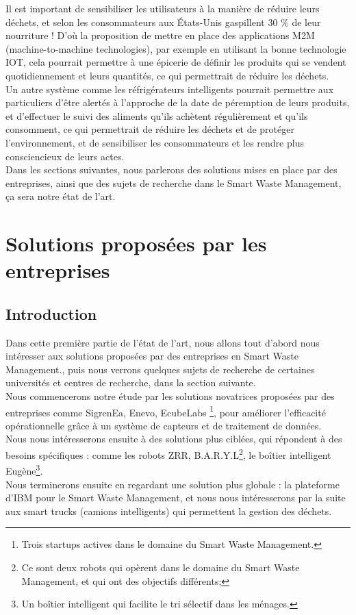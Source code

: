 \documentclass[a4paper,12pt]{report}
\begin{document}
Il est important de sensibiliser les utilisateurs à la manière de réduire leurs déchets, et selon \cite{ref2} les consommateurs aux États-Unis gaspillent 30 \% de leur nourriture ! D’où la proposition de mettre en place des applications M2M (machine-to-machine technologies), par exemple en utilisant la bonne technologie IOT, cela pourrait permettre à une épicerie de définir les produits qui se vendent quotidiennement et leurs quantités, ce qui permettrait de réduire les déchets.\\ Un autre système comme les réfrigérateurs intelligents pourrait permettre aux particuliers d’être alertés à l’approche de la date de péremption de leurs produits, et d’effectuer le suivi des aliments qu’ils achètent régulièrement et qu’ils consomment, ce qui permettrait de réduire les déchets et de protéger l’environnement, et de sensibiliser les consommateurs et les rendre plus consciencieux de leurs actes.\\
Dans les sections suivantes, nous parlerons des solutions mises en place par des entreprises, ainsi que des sujets de recherche dans le Smart Waste Management, ça sera notre état de l'art.
 
\section{Solutions proposées par les entreprises}
\subsection{Introduction}
Dans cette première partie de l'état de l'art, nous allons tout d'abord nous intéresser aux solutions proposées par des entreprises en Smart Waste Management., puis nous verrons quelques sujets de recherche de certaines universités et centres de recherche, dans la section suivante.\\
Nous commencerons notre étude par les solutions novatrices proposées par des entreprises comme SigrenEa, Enevo, EcubeLabs \footnote{Trois startups actives dans le domaine du Smart Waste Management.}, pour améliorer l'efficacité opérationnelle grâce à un système de capteurs et de traitement de données.\\
Nous nous intéresserons ensuite à des solutions plus ciblées, qui répondent à des besoins spécifiques : comme les robots ZRR, B.A.R.Y.L\footnote{Ce sont deux robots qui opèrent dans le domaine du Smart Waste Management, et qui ont des objectifs différents;}, le boîtier intelligent Eugène\footnote{Un boîtier intelligent qui facilite le tri sélectif dans les ménages.}.\\
Nous terminerons ensuite en regardant une solution plus globale : la plateforme d'IBM pour le Smart Waste Management, et nous nous intéresserons par la suite aux smart trucks (camions intelligents) qui permettent la gestion des déchets.
\end{document}
